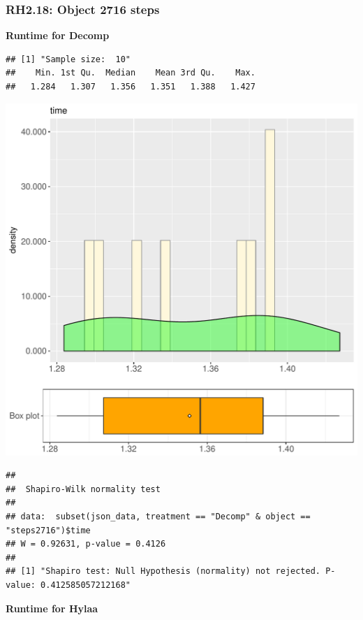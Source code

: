 \documentclass{article}\usepackage[]{graphicx}\usepackage[]{color}
\makeatletter
\def\maxwidth{ %
  \ifdim\Gin@nat@width>\linewidth
    \linewidth
  \else
    \Gin@nat@width
  \fi
}
\newenvironment{kframe}{%
 \def\at@end@of@kframe{}%
 \ifinner\ifhmode%
  \def\at@end@of@kframe{\end{minipage}}%
  \begin{minipage}{\columnwidth}%
 \fi\fi%
 \def\FrameCommand##1{\hskip\@totalleftmargin \hskip-\fboxsep
 \colorbox{shadecolor}{##1}\hskip-\fboxsep
     \hskip-\linewidth \hskip-\@totalleftmargin \hskip\columnwidth}%
 \MakeFramed {\advance\hsize-\width
   \@totalleftmargin\z@ \linewidth\hsize
   \@setminipage}}%
 {\par\unskip\endMakeFramed%
 \at@end@of@kframe}
\newenvironment{knitrout}{}{} %
\makeatother
\begin{document}
\subsubsection{RH2.18: Object 2716 steps}

 \textbf{Runtime for Decomp}
\begin{knitrout}
\color{fgcolor}\begin{kframe}
\begin{verbatim}
## [1] "Sample size:  10"
##    Min. 1st Qu.  Median    Mean 3rd Qu.    Max. 
##   1.284   1.307   1.356   1.351   1.388   1.427
\end{verbatim}
\end{kframe}
\includegraphics[width=\maxwidth]{figure/RH2_Decomp_steps2716-1} 
\begin{kframe}\begin{verbatim}
## 
## 	Shapiro-Wilk normality test
## 
## data:  subset(json_data, treatment == "Decomp" & object == "steps2716")$time
## W = 0.92631, p-value = 0.4126
## 
## [1] "Shapiro test: Null Hypothesis (normality) not rejected. P-value: 0.412585057212168"
\end{verbatim}
\end{kframe}
\end{knitrout}
 \textbf{Runtime for Hylaa}
\end{document}
